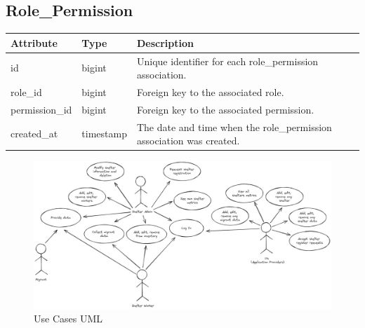 \documentclass{scrreprt}
\begin{document}
\subsection*{Role\_Permission}
\begin{tabular}{|m{2.5cm}|m{2.5cm}|m{6cm}|}
\hline
\textbf{Attribute} & \textbf{Type} & \textbf{Description} \\
\hline
id & bigint & Unique identifier for each role\_permission association. \\
\hline
role\_id & bigint & Foreign key to the associated role. \\
\hline
permission\_id & bigint & Foreign key to the associated permission. \\
\hline
created\_at & timestamp & The date and time when the role\_permission association was created. \\
\hline
\end{tabular}

\begin{figure}[H]
    \centering
    \includegraphics[width=1.3\textwidth, angle=90]{figures/use-cases.jpeg}
    \caption{Use Cases UML}
\end{figure}
\end{document}
